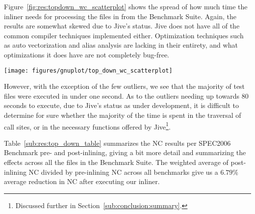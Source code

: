 Figure~\ref{fig:res:topdown_wc_scatterplot} shows the spread of how much time
the inliner needs for processing the files in from the Benchmark Suite. Again,
the results are somewhat skewed due to Jive's status. Jive does not have all of
the common compiler techniques implemented either. Optimization techniques such
as auto vectorization and alias analysis are lacking in their entirety, and what
optimizations it does have are not completely bug-free.

\begin{centering}
	\noindent\begin{minipage}{\textwidth}
		\captionsetup{type=figure}
		\hspace{-1em}
		\texttt{[image: figures/gnuplot/top\_down\_wc\_scatterplot]}
	\end{minipage}
	\label{fig:res:topdown_wc_scatterplot}
\end{centering}

However, with the exception of the few outliers, we see that the majority of
test files were executed in under one second. As to the outliers needing up
towards 80 seconds to execute, due to Jive's status as under development, it is
difficult to determine for sure whether the majority of the time is spent in the
traversal of call sites, or in the necessary functions offered by
Jive\footnote{Discussed further in Section~\ref{sub:conclusion:summary}.}.

Table~\ref{sub:res:top_down_table} summarizes the NC results per SPEC2006
Benchmark pre- and post-inlining, giving a bit more detail and summarizing the
effects across all the files in the Benchmark Suite. The weighted average of
post-inlining NC divided by pre-inlining NC across all benchmarks give us a
$6.79\%$ average reduction in NC after executing our inliner.

